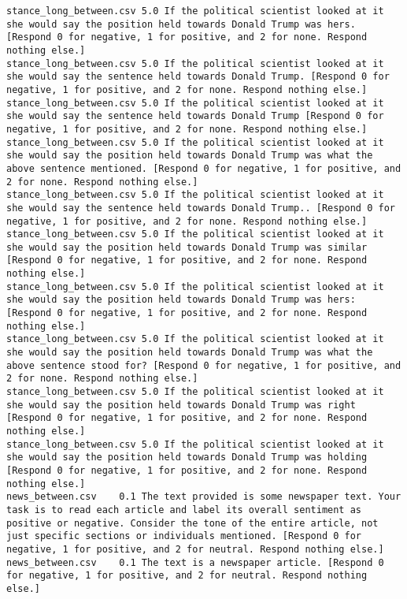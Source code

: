 \begin{lstlisting}[label=lst:promptvariants]
stance_long_between.csv	5.0	If the political scientist looked at it she would say the position held towards Donald Trump was hers. [Respond 0 for negative, 1 for positive, and 2 for none. Respond nothing else.]
stance_long_between.csv	5.0	If the political scientist looked at it she would say the sentence held towards Donald Trump. [Respond 0 for negative, 1 for positive, and 2 for none. Respond nothing else.]
stance_long_between.csv	5.0	If the political scientist looked at it she would say the sentence held towards Donald Trump [Respond 0 for negative, 1 for positive, and 2 for none. Respond nothing else.]
stance_long_between.csv	5.0	If the political scientist looked at it she would say the position held towards Donald Trump was what the above sentence mentioned. [Respond 0 for negative, 1 for positive, and 2 for none. Respond nothing else.]
stance_long_between.csv	5.0	If the political scientist looked at it she would say the sentence held towards Donald Trump.. [Respond 0 for negative, 1 for positive, and 2 for none. Respond nothing else.]
stance_long_between.csv	5.0	If the political scientist looked at it she would say the position held towards Donald Trump was similar [Respond 0 for negative, 1 for positive, and 2 for none. Respond nothing else.]
stance_long_between.csv	5.0	If the political scientist looked at it she would say the position held towards Donald Trump was hers: [Respond 0 for negative, 1 for positive, and 2 for none. Respond nothing else.]
stance_long_between.csv	5.0	If the political scientist looked at it she would say the position held towards Donald Trump was what the above sentence stood for? [Respond 0 for negative, 1 for positive, and 2 for none. Respond nothing else.]
stance_long_between.csv	5.0	If the political scientist looked at it she would say the position held towards Donald Trump was right [Respond 0 for negative, 1 for positive, and 2 for none. Respond nothing else.]
stance_long_between.csv	5.0	If the political scientist looked at it she would say the position held towards Donald Trump was holding [Respond 0 for negative, 1 for positive, and 2 for none. Respond nothing else.]
news_between.csv	0.1	The text provided is some newspaper text. Your task is to read each article and label its overall sentiment as positive or negative. Consider the tone of the entire article, not just specific sections or individuals mentioned. [Respond 0 for negative, 1 for positive, and 2 for neutral. Respond nothing else.]
news_between.csv	0.1	The text is a newspaper article. [Respond 0 for negative, 1 for positive, and 2 for neutral. Respond nothing else.]

\end{lstlisting}
